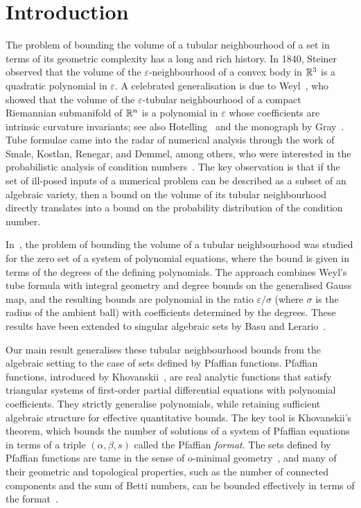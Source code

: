 \section{Introduction}
The problem of bounding the volume of a tubular neighbourhood of a set in terms of its geometric complexity has a long and rich history. In 1840, Steiner~\cite{steiner1840bestimmung} observed that the volume of the $\varepsilon$-neighbourhood of a convex body in $\mathbb{R}^3$ is a quadratic polynomial in $\varepsilon$. A celebrated generalisation is due to Weyl~\cite{weyl1939volume}, who showed that the volume of the $\varepsilon$-tubular neighbourhood of a compact Riemannian submanifold of $\mathbb{R}^n$ is a polynomial in $\varepsilon$ whose coefficients are intrinsic curvature invariants; see also Hotelling~\cite{hotelling1939tubes} and the monograph by Gray~\cite{gray2004tubes}. Tube formulae came into the radar of numerical analysis through the work of Smale, Kostlan, Renegar, and Demmel, among others, who were interested in the probabilistic analysis of condition numbers~\cite{burgisser2013condition}. The key observation is that if the set of ill-posed inputs of a numerical problem can be described as a subset of an algebraic variety, then a bound on the volume of its tubular neighbourhood directly translates into a bound on the probability distribution of the condition number.

In~\cite{lotz2015volume}, the problem of bounding the volume of a tubular neighbourhood was studied for the zero set of a system of polynomial equations, where the bound is given in terms of the degrees of the defining polynomials. The approach combines Weyl's tube formula with integral geometry and degree bounds on the generalised Gauss map, and the resulting bounds are polynomial in the ratio $\varepsilon/\sigma$ (where $\sigma$ is the radius of the ambient ball) with coefficients determined by the degrees. These results have been extended to singular algebraic sets by Basu and Lerario~\cite{basu2021hausdorff}.

Our main result generalises these tubular neighbourhood bounds from the algebraic setting to the case of sets defined by Pfaffian functions. Pfaffian functions, introduced by Khovanskii~\cite{khovanskiui1991fewnomials}, are real analytic functions that satisfy triangular systems of first-order partial differential equations with polynomial coefficients. They strictly generalise polynomials, while retaining sufficient algebraic structure for effective quantitative bounds. The key tool is Khovanskii's theorem, which bounds the number of solutions of a system of Pfaffian equations in terms of a triple $(\alpha, \beta, s)$ called the Pfaffian \emph{format}. The sets defined by Pfaffian functions are tame in the sense of o-minimal geometry~\cite{wilkie1996model, wilkie1999theorem}, and many of their geometric and topological properties, such as the number of connected components and the sum of Betti numbers, can be bounded effectively in terms of the format~\cite{gabrielov2004complexity}.

